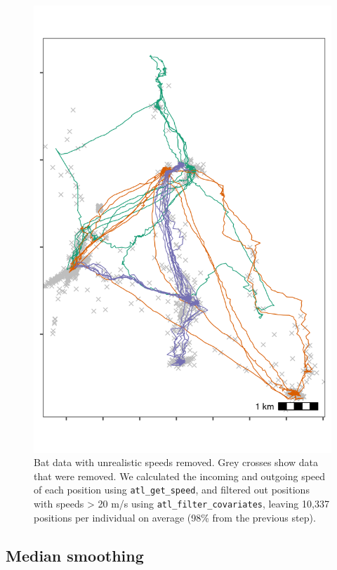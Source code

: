 \documentclass[
]{scrartcl}
\begin{document}
\begin{figure}
\centering
\includegraphics{figures/fig_bat_filter_speed.png}
\caption{Bat data with unrealistic speeds removed. Grey crosses show data that were removed. We calculated the incoming and outgoing speed of each position using \texttt{atl\_get\_speed}, and filtered out positions with speeds \textgreater{} 20 m/s using \texttt{atl\_filter\_covariates}, leaving 10,337 positions per individual on average (98\% from the previous step).}
\end{figure}

\hypertarget{median-smoothing}{%
\subsection{Median smoothing}\label{median-smoothing}}
\end{document}
